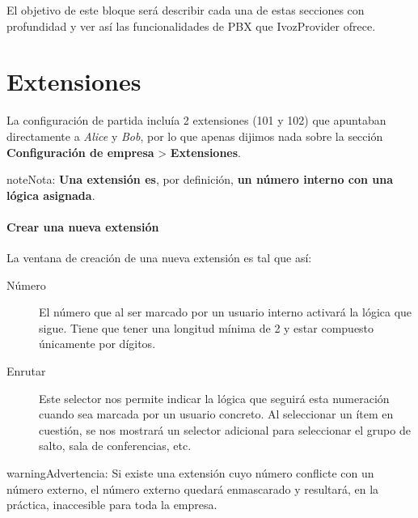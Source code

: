 \documentclass[letterpaper,10pt,spanish]{sphinxmanual}
\begin{document}
El objetivo de este bloque será describir cada una de estas secciones con profundidad y ver así las funcionalidades de PBX que IvozProvider ofrece.


\section{Extensiones}
\label{pbx_features/extensions:extensions}\label{pbx_features/extensions::doc}
La configuración de partida incluía 2 extensiones (101 y 102) que apuntaban directamente a \emph{Alice} y \emph{Bob}, por lo que apenas dijimos nada sobre la sección \textbf{Configuración de empresa} \textgreater{} \textbf{Extensiones}.

\begin{notice}{note}{Nota:}
\textbf{Una extensión es}, por definición, \textbf{un número interno con una lógica asignada}.
\end{notice}
\paragraph{Crear una nueva extensión}

La ventana de creación de una nueva extensión es tal que así:

\noindent{}
\begin{description}
\item[{Número}] \leavevmode{}\label{pbx_features/extensions:term-number}
El número que al ser marcado por un usuario interno activará la lógica que sigue. Tiene que tener una longitud mínima de 2 y estar compuesto únicamente por dígitos.

\item[{Enrutar}] \leavevmode{}\label{pbx_features/extensions:term-route}
Este selector nos permite indicar la lógica que seguirá esta numeración cuando sea marcada por un usuario concreto. Al seleccionar un ítem en cuestión, se nos mostrará un selector adicional para seleccionar el grupo de salto, sala de conferencias, etc.

\end{description}

\begin{notice}{warning}{Advertencia:}
Si existe una extensión cuyo número conflicte con un número externo, el número externo quedará enmascarado y resultará, en la práctica, inaccesible para toda la empresa.
\end{notice}
\end{document}
